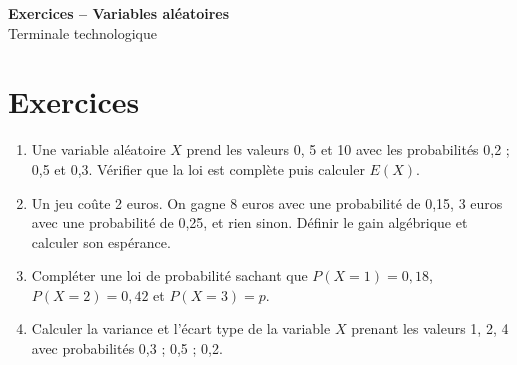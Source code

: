 \documentclass[french,11pt]{book}
\begin{document}
\begin{center}
{\Large \textbf{Exercices -- Variables aléatoires}}\\[2mm]
Terminale technologique
\end{center}

\section*{Exercices}
\begin{enumerate}
  \item Une variable aléatoire $X$ prend les valeurs 0, 5 et 10 avec les probabilités 0,2 ; 0,5 et 0,3. Vérifier que la loi est complète puis calculer $E(X)$.
  \item Un jeu coûte 2 euros. On gagne 8 euros avec une probabilité de 0,15, 3 euros avec une probabilité de 0,25, et rien sinon. Définir le gain algébrique et calculer son espérance.
  \item Compléter une loi de probabilité sachant que $P(X=1)=0,18$, $P(X=2)=0,42$ et $P(X=3)=p$.
  \item Calculer la variance et l'écart type de la variable $X$ prenant les valeurs 1, 2, 4 avec probabilités 0,3 ; 0,5 ; 0,2.
\end{enumerate}
\end{document}
